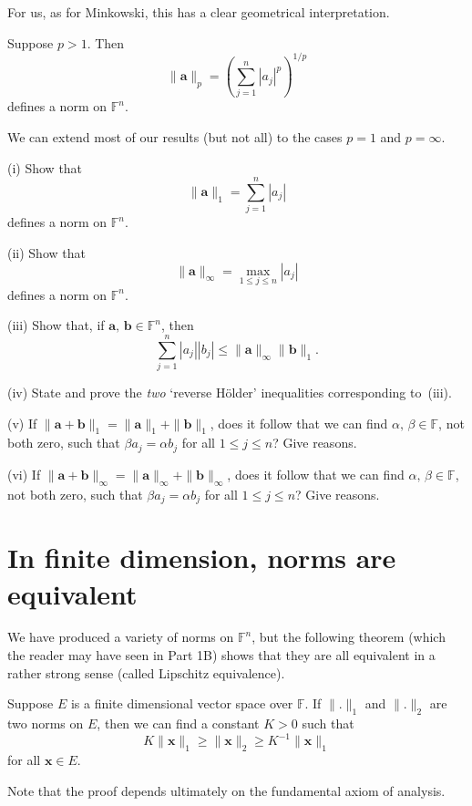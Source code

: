 For us, as for Minkowski, this has a clear geometrical interpretation.
\begin{theorem} Suppose $p>1$. Then
\[\|{\mathbf a}\|_{p}=\left(\sum_{j=1}^{n}|a_{j}|^{p}\right)^{1/p}\]
defines a norm on ${\mathbb F}^{n}$.
\end{theorem}
We can extend most of our results (but not all) to
the cases $p=1$ and $p=\infty$.
\begin{exercise}
(i) Show that
\[\|{\mathbf a}\|_{1}=\sum_{j=1}^{n}|a_{j}|\]
defines a norm on ${\mathbb F}^{n}$.

(ii) Show that
\[\|{\mathbf a}\|_{\infty}=\max_{1\leq j\leq n}|a_{j}|\] 
defines a norm on ${\mathbb F}^{n}$.

(iii) Show that, if ${\mathbf a},\,{\mathbf b}\in{\mathbb F}^{n}$,
then
\[\sum_{j=1}^{n}|a_{j}||b_{j}|\leq \|{\mathbf a}\|_{\infty}
\|{\mathbf b}\|_{1}.\]

(iv) State and prove the \emph{two} `reverse H{\"o}lder'
inequalities corresponding to~(iii).

(v) If $\|{\mathbf a}+{\mathbf b}\|_{1}=
\|{\mathbf a}\|_{1}+\|{\mathbf b}\|_{1}$,
does it follow that we can find $\alpha,\,\beta\in{\mathbb F}$,
not both zero,
such that $\beta a_{j}=\alpha b_{j}$ for all $1\leq j\leq n$?
Give reasons.

(vi) If $\|{\mathbf a}+{\mathbf b}\|_{\infty}= 
\|{\mathbf a}\|_{\infty}+\|{\mathbf b}\|_{\infty}$,
does it follow that we can find $\alpha,\,\beta\in{\mathbb F}$,
not both zero,
such that $\beta a_{j}=\alpha b_{j}$ for all $1\leq j\leq n$?
Give reasons.
\end{exercise}
\section{In finite dimension, norms are equivalent}
We have produced a variety of norms on ${\mathbb F}^{n}$,
but the following theorem (which the reader may have seen in
Part 1B) shows that they are all equivalent in a rather
strong sense (called Lipschitz equivalence).
\begin{theorem}\label{T;norms same} 
Suppose $E$ is a finite dimensional vector space
over ${\mathbb F}$.
If $\|.\|_{1}$ and $\|.\|_{2}$ are two norms on $E$,
then we can find a constant $K>0$ such that
\[K\|{\mathbf x}\|_{1}\geq \|{\mathbf x}\|_{2}
\geq K^{-1}\|{\mathbf x}\|_{1}\]
for all ${\mathbf x}\in E$.
\end{theorem}
Note that the proof depends ultimately on the fundamental axiom
of analysis.

